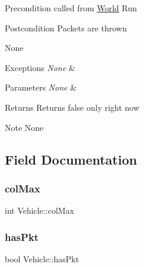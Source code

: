\begin{DoxyPrecond}{Precondition}
called from \hyperlink{class_world}{World} Run
\end{DoxyPrecond}
\begin{DoxyPostcond}{Postcondition}
Packets are thrown
\end{DoxyPostcond}
\begin{DoxyParagraph}{None}

\end{DoxyParagraph}

\begin{DoxyExceptions}{Exceptions}
{\em None} & \\
\hline
\end{DoxyExceptions}

\begin{DoxyParams}{Parameters}
{\em None} & \\
\hline
\end{DoxyParams}
\begin{DoxyReturn}{Returns}
Returns false only right now
\end{DoxyReturn}
\begin{DoxyNote}{Note}
None 
\end{DoxyNote}


\subsection{Field Documentation}
\hypertarget{class_vehicle_a8364facc67825674d98b0fd8daf2ebee}{}\label{class_vehicle_a8364facc67825674d98b0fd8daf2ebee} 
\subsubsection{\texorpdfstring{col\+Max}{colMax}}
{\footnotesize\ttfamily int Vehicle\+::col\+Max\hspace{0.3cm}{\ttfamily [protected]}}

\hypertarget{class_vehicle_a1d5bd3f458b1c11f0034320e8be4ae32}{}\label{class_vehicle_a1d5bd3f458b1c11f0034320e8be4ae32} 
\subsubsection{\texorpdfstring{has\+Pkt}{hasPkt}}
{\footnotesize\ttfamily bool Vehicle\+::has\+Pkt\hspace{0.3cm}{\ttfamily [protected]}}

